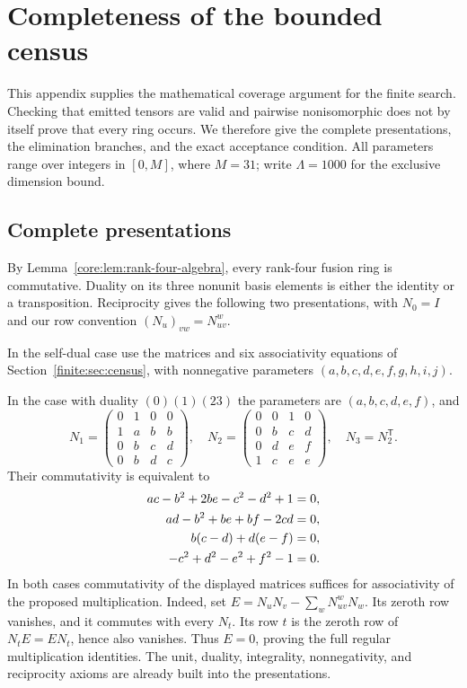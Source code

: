 \section{Completeness of the bounded census}\label{app:ordinary-census}
This appendix supplies the mathematical coverage argument for the finite
search. Checking that emitted tensors are valid and pairwise nonisomorphic
does not by itself prove that every ring occurs. We therefore give the
complete presentations, the elimination branches, and the exact acceptance
condition. All parameters range over integers in $[0,M]$, where $M=31$;
write $\Lambda=1000$ for the exclusive dimension bound.

\subsection{Complete presentations}
By Lemma~\ref{core:lem:rank-four-algebra}, every rank-four fusion ring is
commutative. Duality on its three nonunit basis elements is either the
identity or a transposition. Reciprocity gives the following two
presentations, with $N_0=I$ and our row convention
$(N_u)_{vw}=N_{uv}^{w}$.

In the self-dual case use the matrices and six associativity equations
of Section~\ref{finite:sec:census}, with nonnegative parameters
$(a,b,c,d,e,f,g,h,i,j)$.

In the case with duality $(0)(1)(23)$ the parameters are $(a,b,c,d,e,f)$,
and
\[
 N_1=\begin{pmatrix}0&1&0&0\\1&a&b&b\\0&b&c&d\\0&b&d&c\end{pmatrix},\quad
 N_2=\begin{pmatrix}0&0&1&0\\0&b&c&d\\0&d&e&f\\1&c&e&e\end{pmatrix},\quad
 N_3=N_2^{\mathsf T}.
\]
Their commutativity is equivalent to
\begin{align}
 ac-b^2+2be-c^2-d^2+1&=0,\notag\\
 ad-b^2+be+bf-2cd&=0,\label{census:eq:ns-assoc}\\
 b(c-d)+d(e-f)&=0,\notag\\
 -c^2+d^2-e^2+f^2-1&=0.\notag
\end{align}
In both cases commutativity of the displayed matrices suffices for
associativity of the proposed multiplication. Indeed, set
$E=N_uN_v-\sum_w N_{uv}^{w}N_w$. Its zeroth row vanishes, and it
commutes with every $N_t$. Its row $t$ is the zeroth row of
$N_tE=EN_t$, hence also vanishes. Thus $E=0$, proving the full
regular multiplication identities. The unit, duality, integrality,
nonnegativity, and reciprocity axioms are already built into the
presentations.

